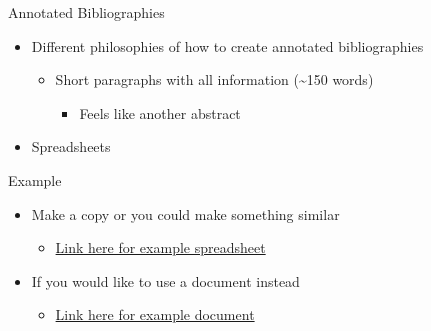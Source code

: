 \documentclass[
  ignorenonframetext,
]{beamer}
\providecommand{\tightlist}{%
  \setlength{\itemsep}{0pt}\setlength{\parskip}{0pt}}
\begin{document}
\begin{frame}{Annotated Bibliographies}
\label{annotated-bibliographies}
\begin{itemize}
\tightlist
\item
  Different philosophies of how to create annotated bibliographies

  \begin{itemize}
  \tightlist
  \item
    Short paragraphs with all information (\textasciitilde150 words)

    \begin{itemize}
    \tightlist
    \item
      Feels like another abstract
    \end{itemize}
  \end{itemize}
\item
  Spreadsheets
\end{itemize}
\end{frame}

\begin{frame}{Example}
\label{example}
\begin{itemize}
\tightlist
\item
  Make a copy or you could make something similar

  \begin{itemize}
  \tightlist
  \item
    \href{https://docs.google.com/spreadsheets/d/1plQjbtrMaPI9DM4vQAvvtYT2diX3pFjHXNdHUDxG0xE/edit?usp=sharing}{Link
    here for example spreadsheet}
  \end{itemize}
\item
  If you would like to use a document instead

  \begin{itemize}
  \tightlist
  \item
    \href{https://docs.google.com/document/d/13HKVF_CSMAKfT0NoHcd5H4DejZu19BxKZua_tgHF2Lo/edit?usp=sharing}{Link
    here for example document}
  \end{itemize}
\end{itemize}
\end{frame}
\end{document}

